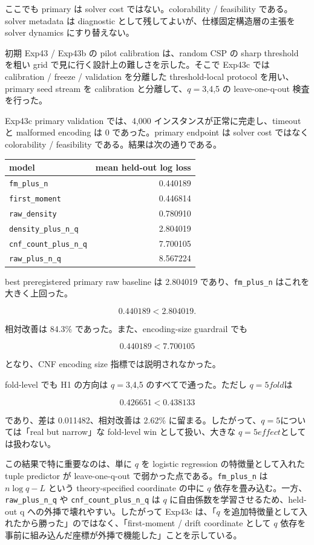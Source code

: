 \documentclass[12pt,a4paper]{article}
\begin{document}
ここでも primary は solver cost ではない。colorability / feasibility である。solver metadata は diagnostic として残してよいが、仕様固定構造層の主張を solver dynamics にすり替えない。

初期 Exp43 / Exp43b の pilot calibration は、random CSP の sharp threshold を粗い grid で見に行く設計上の難しさを示した。そこで Exp43c では calibration / freeze / validation を分離した threshold-local protocol を用い、primary seed stream を calibration と分離して、\(q=3\),4,5 の leave-one-q-out 検査を行った。

Exp43c primary validation では、4,000 インスタンスが正常に完走し、timeout と malformed encoding は 0 であった。primary endpoint は solver cost ではなく colorability / feasibility である。結果は次の通りである。

{\def\LTcaptype{table} %
\begin{longtable}[]{@{}lr@{}}
\toprule\noalign{}
model & mean held-out log loss \\
\midrule\noalign{}
\endhead
\bottomrule\noalign{}
\endlastfoot
\texttt{fm\_plus\_n} & 0.440189 \\
\texttt{first\_moment} & 0.446814 \\
\texttt{raw\_density} & 0.780910 \\
\texttt{density\_plus\_n\_q} & 2.804019 \\
\texttt{cnf\_count\_plus\_n\_q} & 7.700105 \\
\texttt{raw\_plus\_n\_q} & 8.567224 \\
\end{longtable}
}

best preregistered primary raw baseline は 2.804019 であり、\texttt{fm\_plus\_n} はこれを大きく上回った。

\[
0.440189 < 2.804019.
\]

相対改善は 84.3\% であった。また、encoding-size guardrail でも

\[
0.440189 < 7.700105
\]

となり、CNF encoding size 指標では説明されなかった。

fold-level でも H1 の方向は \(q=3\),4,5 のすべてで通った。ただし \(q=5 fold\)は

\[
0.426651 < 0.438133
\]

であり、差は 0.011482、相対改善は 2.62\% に留まる。したがって、\(q=5\)については「real but narrow」な fold-level win として扱い、大きな \(q=5 effect\)としては扱わない。

この結果で特に重要なのは、単に \(q\) を logistic regression の特徴量として入れた tuple predictor が leave-one-q-out で弱かった点である。\texttt{fm\_plus\_n} は \(n\log q-L\) という theory-specified coordinate の中に \(q\) 依存を畳み込む。一方、\texttt{raw\_plus\_n\_q} や \texttt{cnf\_count\_plus\_n\_q} は \(q\) に自由係数を学習させるため、held-out q への外挿で壊れやすい。したがって Exp43c は、「\(q\) を追加特徴量として入れたから勝った」のではなく、「first-moment / drift coordinate として \(q\) 依存を事前に組み込んだ座標が外挿で機能した」ことを示している。
\end{document}
